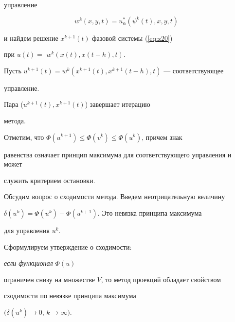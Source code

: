 управление


$$


w^k(x,y,t)=u_\alpha^*(\psi^k(t),x,y,t)


$$


и найдем решение $x^{k+1}(t)$ фазовой системы (\ref{eq:z20})


при $u(t)=$ $w^k(x(t),x(t-h),t)$.





Пусть $u^{k+1}(t)=w^k(x^{k+1}(t),x^{k+1}(t-h),t)$ --- соответствующее


управление.





Пара ($u^{k+1}(t),x^{k+1}(t)$) завершает итерацию


метода.





Отметим, что $\Phi(u^{k+1})\leq\Phi(v^k)\leq\Phi(u^k)$, причем знак


равенства означает принцип максимума для соответствующего управления и может


служить критерием остановки.





Обсудим вопрос о сходимости метода. Введем неотрицательную величину


$\delta(u^k)=\Phi(u^k)-\Phi(u^{k+1})$. Это невязка принципа максимума


для управления $u^k$.





Сформулируем утверждение о сходимости: {\it если функционал $\Phi(u)$


ограничен снизу на множестве $V$, то метод проекций обладает свойством


сходимости по невязке принципа максимума


$(\delta(u^k)\to 0$, $k\to\infty)$.}





